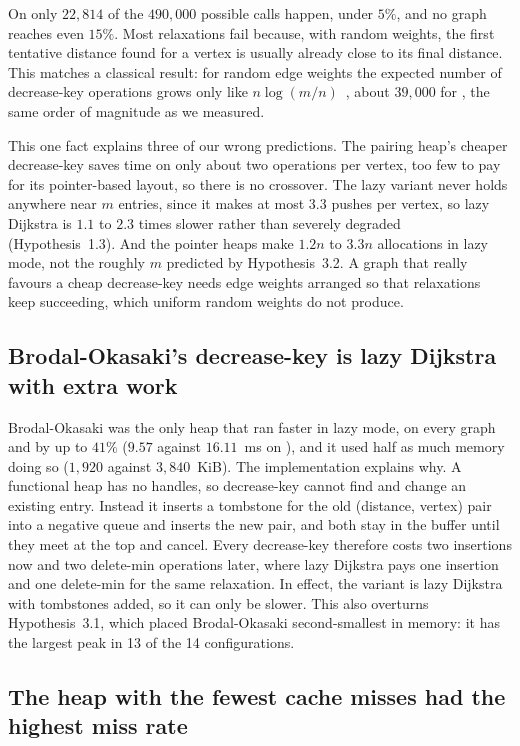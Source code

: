On  only $22{,}814$ of the $490{,}000$ possible calls
happen, under $5\%$, and no graph reaches even $15\%$. Most relaxations fail
because, with random weights, the first tentative distance found for a vertex
is usually already close to its final distance. This matches a classical
result: for random edge weights the expected number of decrease-key
operations grows only like $n \log(m/n)$~\cite{noshita1985}, about $39{,}000$ for
, the same order of magnitude as we measured.

This one fact explains three of our wrong predictions. The pairing heap's
cheaper decrease-key saves time on only about two operations per vertex, too
few to pay for its pointer-based layout, so there is no crossover. The lazy
variant never holds anywhere near $m$ entries, since it makes at most $3.3$
pushes per vertex, so lazy Dijkstra is $1.1$ to $2.3$ times slower rather than
severely degraded (Hypothesis~1.3). And the pointer heaps make $1.2n$ to
$3.3n$ allocations in lazy mode, not the roughly $m$ predicted by
Hypothesis~3.2. A graph that really favours a cheap decrease-key needs edge
weights arranged so that relaxations keep succeeding, which uniform random
weights do not produce.

\subsection{Brodal-Okasaki's decrease-key is lazy Dijkstra with extra work}

Brodal-Okasaki was the only heap that ran faster in lazy mode, on every graph
and by up to $41\%$ ($9.57$ against $16.11$~ms on ), and
it used half as much memory doing so ($1{,}920$ against $3{,}840$~KiB). The
implementation explains why. A functional heap has no handles, so
decrease-key cannot find and change an existing entry. Instead it inserts a
tombstone for the old (distance, vertex) pair into a negative queue and
inserts the new pair, and both stay in the buffer until they meet at the top
and cancel. Every decrease-key therefore costs two insertions now and two
delete-min operations later, where lazy Dijkstra pays one insertion and one
delete-min for the same relaxation. In effect, the  variant
is lazy Dijkstra with tombstones added, so it can only be slower. This also
overturns Hypothesis~3.1, which placed Brodal-Okasaki second-smallest in
memory: it has the largest peak in 13 of the 14 configurations.

\subsection{The heap with the fewest cache misses had the highest miss rate}

